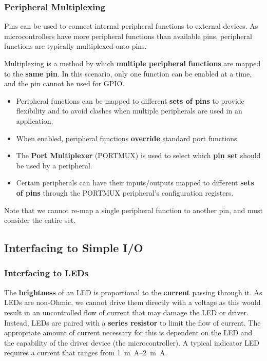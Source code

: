\documentclass{article}
\begin{document}
\subsubsection{Peripheral Multiplexing}
Pins can be used to connect internal peripheral functions to external
devices. As microcontrollers have more peripheral functions than
available pins, peripheral functions are typically multiplexed onto
pins.
\begin{definition}[Multiplexing]
    Multiplexing is a method by which \textbf{multiple peripheral} \linebreak \textbf{functions}
    are mapped to the \textbf{same pin}.
    In this scenario, only one function can be enabled at a time, and the pin
    cannot be used for GPIO\@.
\end{definition}
\begin{itemize}
    \item Peripheral functions can be mapped to different \textbf{sets
          of pins} to provide flexibility and to avoid clashes when
          multiple peripherals are used in an application.
    \item When enabled, peripheral functions \textbf{override} standard
          port functions.
    \item The \textbf{Port Multiplexer} (PORTMUX) is used to select
          which \textbf{pin set} should be used by a peripheral.
    \item Certain peripherals can have their inputs/outputs mapped to
          different \textbf{sets of pins} through the PORTMUX
          peripheral's configuration registers.
\end{itemize}
Note that we cannot re-map a single peripheral function to another pin,
and must consider the entire set.
\subsection{Interfacing to Simple I/O}
\subsubsection{Interfacing to LEDs}
The \textbf{brightness} of an LED is proportional to the
\textbf{current} passing through it. As LEDs are non-Ohmic, we cannot
drive them directly with a voltage as this would result in an
uncontrolled flow of current that may damage the LED or driver.
Instead, LEDs are paired with a \textbf{series resistor} to limit the
flow of current. The appropriate amount of current necessary for this
is dependent on the LED and the capability of the driver device (the
microcontroller). A typical indicator LED requires a current that
ranges from \qtyrange{1}{2}{m.A}.
\end{document}
